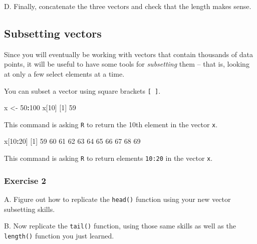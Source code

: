 \documentclass[
]{book}
\newenvironment{Shaded}{\begin{snugshade}}{\end{snugshade}}
\newcommand{\DecValTok}[1]{\textcolor[rgb]{0.00,0.00,0.81}{#1}}
\newcommand{\NormalTok}[1]{#1}
\newcommand{\OperatorTok}[1]{\textcolor[rgb]{0.81,0.36,0.00}{\textbf{#1}}}
\newcommand{\StringTok}[1]{\textcolor[rgb]{0.31,0.60,0.02}{#1}}
\begin{document}
D. Finally, concatenate the three vectors and check that the length makes sense.

\hypertarget{subsetting-vectors}{%
\subsection*{Subsetting vectors}\label{subsetting-vectors}}

Since you will eventually be working with vectors that contain thousands of data points, it will be useful to have some tools for \emph{subsetting} them -- that is, looking at only a few select elements at a time.

You can subset a vector using square brackets \texttt{{[}\ {]}}.

\begin{Shaded}
\begin{Highlighting}[]
\NormalTok{x <-}\StringTok{ }\DecValTok{50}\OperatorTok{:}\DecValTok{100}
\NormalTok{x[}\DecValTok{10}\NormalTok{]}
\NormalTok{[}\DecValTok{1}\NormalTok{] }\DecValTok{59}
\end{Highlighting}
\end{Shaded}

This command is asking \texttt{R} to return the 10th element in the vector \texttt{x}.

\begin{Shaded}
\begin{Highlighting}[]
\NormalTok{x[}\DecValTok{10}\OperatorTok{:}\DecValTok{20}\NormalTok{]}
\NormalTok{ [}\DecValTok{1}\NormalTok{] }\DecValTok{59} \DecValTok{60} \DecValTok{61} \DecValTok{62} \DecValTok{63} \DecValTok{64} \DecValTok{65} \DecValTok{66} \DecValTok{67} \DecValTok{68} \DecValTok{69}
\end{Highlighting}
\end{Shaded}

This command is asking \texttt{R} to return elements \texttt{10:20} in the vector \texttt{x}.

\hypertarget{exercise-2-3}{%
\subsubsection*{Exercise 2}\label{exercise-2-3}}

A. Figure out how to replicate the \texttt{head()} function using your new vector subsetting skills.

B. Now replicate the \texttt{tail()} function, using those same skills as well as the \texttt{length()} function you just learned.
\end{document}
